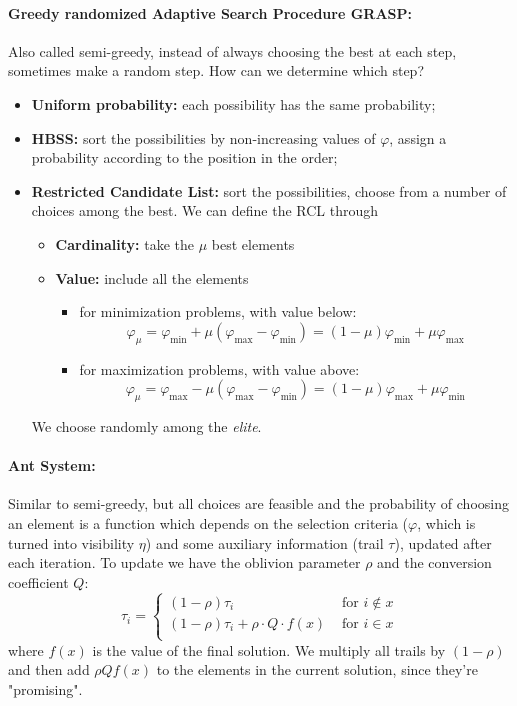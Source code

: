 \documentclass{article}
\begin{document}
	\paragraph{Greedy randomized Adaptive Search Procedure GRASP:} Also called semi-greedy, instead of always choosing the best at each step, sometimes make a random step. How can we determine which step? 
	\begin{itemize}
		\item \textbf{Uniform probability:} each possibility has the same probability;
		\item \textbf{HBSS:} sort the possibilities by non-increasing values of $\varphi$, assign a probability according to the position in the order;
		\item \textbf{Restricted Candidate List:} sort the possibilities, choose from a number of choices among the best. We can define the RCL through 
		\begin{itemize}
			\item \textbf{Cardinality:} take the $\mu$ best elements
			\item \textbf{Value:} include all the elements 
			\begin{itemize}
				\item for minimization problems, with value below:
				$$ \varphi_\mu = \varphi_{\min} + \mu(\varphi_{\max} - \varphi_{\min}) = (1 - \mu) \varphi_{\min} + \mu \varphi_{\max} $$
				\item for maximization problems, with value above:
				$$ \varphi_\mu = \varphi_{\max} - \mu (\varphi_{\max} - \varphi_{\min}) = (1 - \mu) \varphi_{\max} + \mu \varphi_{\min} $$
			\end{itemize}
		\end{itemize}
		We choose randomly among the \textit{elite}.\\
	\end{itemize}
	
	\paragraph{Ant System:} Similar to semi-greedy, but all choices are feasible and the probability of choosing an element is a function which depends on the selection criteria ($\varphi$, which is turned into visibility $\eta$) and some auxiliary information (trail $\tau$), updated after each iteration. To update we have the oblivion parameter $\rho$ and the conversion coefficient $Q$: 
	$$ 
	\tau_i = \begin{cases}
		(1 - \rho) \tau_i & \text{ for } i \notin x \\
		(1 - \rho) \tau_i + \rho \cdot Q \cdot f(x) & \text{ for } i \in x \\
	\end{cases}
	$$
	where $f(x)$ is the value of the final solution. We multiply all trails by $(1-\rho)$ and then add $\rho Q f(x)$ to the elements in the current solution, since they're "promising".\\
\end{document}

